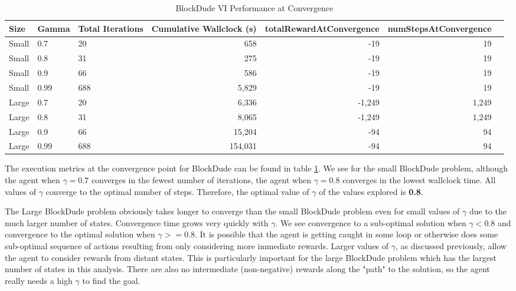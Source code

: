 \documentclass{article}
\begin{document}
\begin{table}
    \centering
    \caption{BlockDude VI Performance at Convergence}
    \label{table:bd-vi-execution}
    \begin{tabular}{lllrrrr}
        \toprule
        Size & Gamma &  Total Iterations &  Cumulative Wallclock (s) &  totalRewardAtConvergence &  numStepsAtConvergence \\
        \midrule
        Small &         0.7 &    20 &               658 &                       -19 &                     19 \\
        Small &         0.8 &    31 &               275 &                       -19 &                     19 \\
        Small &         0.9 &    66 &               586 &                       -19 &                     19 \\
        Small &        0.99 &   688 &              5,829 &                       -19 &                     19 \\
        \midrule
        Large &         0.7 &    20 &              6,336 &                    -1,249 &                   1,249 \\
        Large &         0.8 &    31 &              8,065 &                    -1,249 &                   1,249 \\
        Large &         0.9 &    66 &             15,204 &                       -94 &                     94 \\
        Large &        0.99 &   688 &            154,031 &                       -94 &                     94 \\
        \bottomrule
        \end{tabular}
    \end{table}

The execution metrics at the convergence point for BlockDude can be found in table \ref{table:bd-vi-execution}. We
see for the small BlockDude problem, although the agent when $\gamma = 0.7$ converges in the fewest number of iterations,
the agent when $\gamma = 0.8$ converges in the lowest wallclock time. All values of $\gamma$ converge to the optimal
number of steps. Therefore, the optimal value of $\gamma$ of the values explored is \textbf{0.8}.

The Large BlockDude problem obviously takes longer to converge than the small BlockDude problem even for small values of $\gamma$
due to the much larger number of states. Convergence time grows very quickly with $\gamma$. We see convergence to a
sub-optimal solution when $\gamma < 0.8$ and convergence to the optimal solution when $\gamma >= 0.8$. It is possible that the
agent is getting caught in some loop or otherwise does some sub-optimal sequence of actions resulting from only considering more
immediate rewards. Larger values of $\gamma$, as discussed previously, allow the agent to consider rewards from distant states.
This is particularly important for the large BlockDude problem which has the largest number of states in this analysis. There
are also no intermediate  (non-negative) rewards along the "path" to the solution, so the agent really needs a high $\gamma$ to
find the goal.
\end{document}
